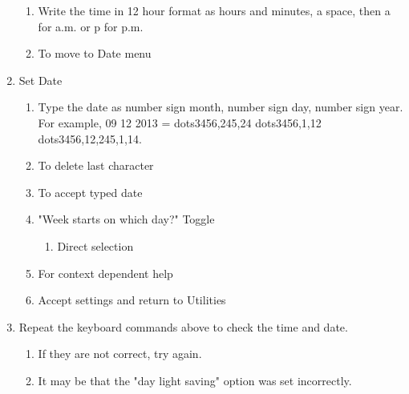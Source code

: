 \documentclass[10pt,letterpaper,twoside]{report}
\begin{document}
\begin{enumerate}
\begin{enumerate}
		      \item Write the time in 12 hour format as hours and minutes, a space, then a for a.m. or p for p.m.
		      \item To move to Date menu 
	      \end{enumerate}
	\item Set Date
	      \begin{enumerate}
		      \item Type the date as number sign month, number sign day, number sign year. For example, 09 12 2013 = dots3456,245,24 dots3456,1,12 dots3456,12,245,1,14.
		      \item To delete last character 
		      \item To accept typed date 
		      \item "Week starts on which day?" Toggle 
		            \begin{enumerate}
			            \item Direct selection 
		            \end{enumerate}
		      \item For context dependent help 
		      \item Accept settings and return to Utilities 
	      \end{enumerate}
	\item Repeat the keyboard commands above to check the time and date.
	      \begin{enumerate}
		      \item If they are not correct, try again.
		      \item It may be that the "day light saving" option was set incorrectly.
	      \end{enumerate}
\end{enumerate}
\end{document}
